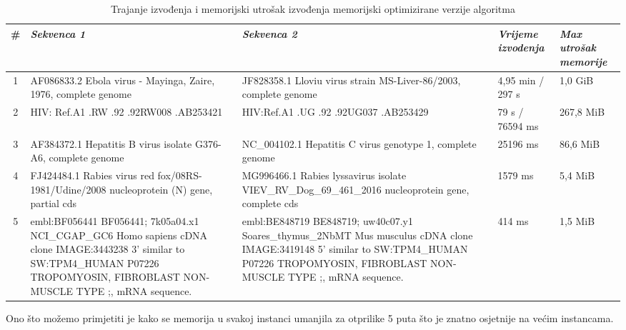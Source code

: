 \documentclass[a4paper]{article}
\begin{document}
\begin{table}[H]
\centering
\begin{tabular}{|c||p{4cm}|p{4cm}|p{2cm}|p{2cm}|}
\hline
# & \textit{\textbf{Sekvenca 1}} & \textit{\textbf{Sekvenca 2}} & \textit{\textbf{Vrijeme izvodenja}} & \textit{\textbf{Max utrošak memorije}} \\ \hline
1 & AF086833.2 Ebola virus - Mayinga, Zaire, 1976, complete genome & JF828358.1 Lloviu virus strain MS-Liver-86/2003, complete genome & 4,95 min / 297 s & 1,0 GiB \\ \hline
2 & HIV: Ref.A1 .RW .92 .92RW008 .AB253421 & HIV:Ref.A1 .UG .92 .92UG037 .AB253429 & 79 s / 76594 ms & 267,8 MiB \\ \hline
3 & AF384372.1 Hepatitis B virus isolate G376-A6, complete genome & NC\_004102.1 Hepatitis C virus genotype 1, complete genome & 25196 ms & 86,6 MiB \\ \hline
4 & FJ424484.1 Rabies virus red fox/08RS-1981/Udine/2008 nucleoprotein (N) gene, partial cds & MG996466.1 Rabies lyssavirus isolate VIEV\_RV\_Dog\_69\_461\_2016 nucleoprotein gene, complete cds & 1579 ms & 5,4 MiB \\ \hline
5 & embl:BF056441 BF056441; 7k05a04.x1 NCI\_CGAP\_GC6 Homo sapiens cDNA clone IMAGE:3443238 3' similar to SW:TPM4\_HUMAN P07226 TROPOMYOSIN, FIBROBLAST NON-MUSCLE TYPE ;, mRNA sequence. & embl:BE848719 BE848719; uw40c07.y1 Soares\_thymus\_2NbMT Mus musculus cDNA clone IMAGE:3419148 5' similar to SW:TPM4\_HUMAN P07226 TROPOMYOSIN, FIBROBLAST NON-MUSCLE TYPE ;, mRNA sequence. & 414 ms & 1,5 MiB \\ \hline
\end{tabular}
\caption{Trajanje izvođenja i memorijski utrošak izvođenja memorijski optimizirane verzije algoritma}
\label{table:economicSchools}   
\end{table}

Ono što možemo primjetiti je kako se memorija u svakoj instanci umanjila za otprilike 5 puta što je znatno osjetnije na većim instancama.
\end{document}
